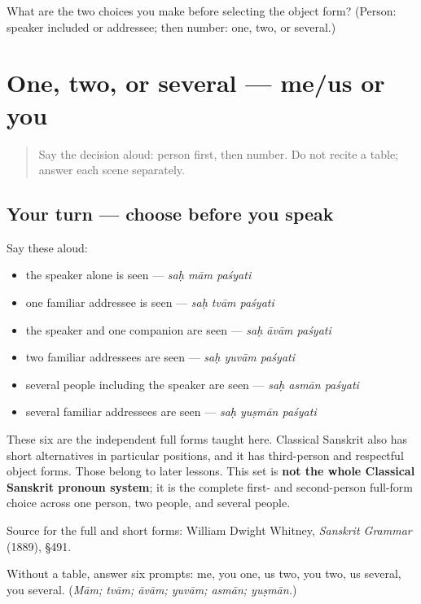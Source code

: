 \begin{tcolorbox}[breakable,colback=teal!4,colframe=teal!35!black,title={Before you move on}]
What are the two choices you make before selecting the object form? (Person: speaker included or addressee; then number: one, two, or several.)
\end{tcolorbox}
\section[Practice]{One, two, or several — me/us or you}

\label{lesson:SA-C262-object-pronoun-retrieval}



\begin{quote}
Say the decision aloud: person first, then number. Do not recite a table; answer each scene separately.
\end{quote}

\subsection*{Your turn — choose before you speak}
Say these aloud:

\begin{itemize}
\raggedright
  \item the speaker alone is seen — \emph{saḥ mām paśyati}
  \item one familiar addressee is seen — \emph{saḥ tvām paśyati}
  \item the speaker and one companion are seen — \emph{saḥ āvām paśyati}
  \item two familiar addressees are seen — \emph{saḥ yuvām paśyati}
  \item several people including the speaker are seen — \emph{saḥ asmān paśyati}
  \item several familiar addressees are seen — \emph{saḥ yuṣmān paśyati}
\end{itemize}

\begin{grammarlens}[title={Grammar Lens: the boundary of this chapter}]
These six are the independent full forms taught here. Classical Sanskrit also has short alternatives in particular positions, and it has third-person and respectful object forms. Those belong to later lessons. This set is \textbf{not the whole Classical Sanskrit pronoun system}; it is the complete first- and second-person full-form choice across one person, two people, and several people.

Source for the full and short forms: William Dwight Whitney, \emph{Sanskrit Grammar} (1889), §491.
\end{grammarlens}

\begin{tcolorbox}[breakable,colback=teal!4,colframe=teal!35!black,title={Before you move on}]
Without a table, answer six prompts: me, you one, us two, you two, us several, you several. (\emph{Mām; tvām; āvām; yuvām; asmān; yuṣmān.})
\end{tcolorbox}
